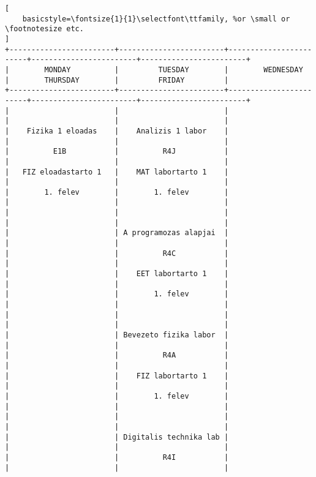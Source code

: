 \begin{lstlisting}[
    basicstyle=\fontsize{1}{1}\selectfont\ttfamily, %or \small or \footnotesize etc.
]
+------------------------+------------------------+------------------------+------------------------+------------------------+
|        MONDAY          |         TUESDAY        |        WEDNESDAY       |        THURSDAY        |         FRIDAY         |
+------------------------+------------------------+------------------------+------------------------+------------------------+
|                        |                        |                        |                        |                        | 
|    Fizika 1 eloadas    |    Analizis 1 labor    |                        |                        |                        | 
|          E1B           |          R4J           |                        |                        |                        | 
|   FIZ eloadastarto 1   |    MAT labortarto 1    |                        |                        |                        | 
|        1. felev        |        1. felev        |                        |                        |                        | 
|                        |                        |                        |                        |                        | 
|                        | A programozas alapjai  |                        |                        |                        | 
|                        |          R4C           |                        |                        |                        | 
|                        |    EET labortarto 1    |                        |                        |                        | 
|                        |        1. felev        |                        |                        |                        | 
|                        |                        |                        |                        |                        | 
|                        | Bevezeto fizika labor  |                        |                        |                        | 
|                        |          R4A           |                        |                        |                        | 
|                        |    FIZ labortarto 1    |                        |                        |                        | 
|                        |        1. felev        |                        |                        |                        | 
|                        |                        |                        |                        |                        | 
|                        | Digitalis technika lab |                        |                        |                        | 
|                        |          R4I           |                        |                        |                        | 

\end{lstlisting}
